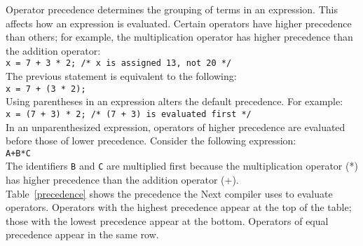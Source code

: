 \documentclass[12pt]{article}
\begin{document}
Operator precedence determines the grouping of terms in an expression.  This affects how an expression is evaluated.  Certain operators have higher precedence than others; for example, the multiplication operator has higher precedence than the addition operator: \\

\texttt{x = 7 + 3 * 2; \hspace{20 mm}  /* x is assigned 13, not 20 */} \\

\noindent The previous statement is equivalent to the following: \\

\texttt{x = 7 + (3 * 2);} \\

\noindent Using parentheses in an expression alters the default precedence.  For example: \\

\texttt{x = (7 + 3) * 2; \hspace{20 mm} /* (7 + 3) is evaluated first */} \\

\noindent In an unparenthesized expression, operators of higher precedence are evaluated before those of lower precedence.  Consider the following expression: \\

\texttt{A+B*C} \\

\noindent The identifiers \texttt{B} and \texttt{C} are multiplied first because the multiplication operator (*) has higher precedence than the addition operator (+). \\

\noindent Table~\ref{precedence} shows the precedence the Next compiler uses to evaluate operators.  Operators with the highest precedence appear at the top of the table; those with the lowest precedence appear at the bottom.  Operators of equal precedence appear in the same row. \\
\end{document}
